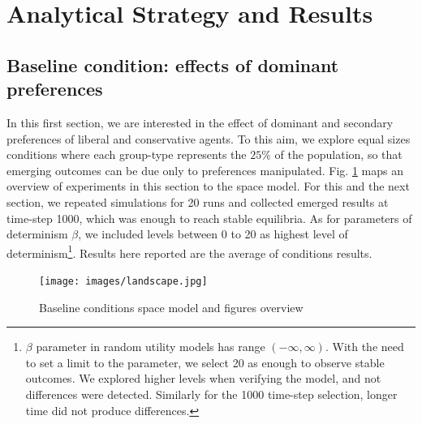 \documentclass[
]{article}
\begin{document}
\hypertarget{Analytical Strategy and Results}{%
\section{Analytical Strategy and Results}\label{results}}


\subsection{Baseline condition: effects of dominant preferences}

In this first section, we are interested in the effect of dominant and secondary preferences of liberal and conservative agents. To this aim, we explore equal sizes conditions where each group-type represents the $25\%$ of the population, so that emerging outcomes can be due only to preferences manipulated. Fig. \ref{fig:landscape} maps an overview of experiments in this section to the space model. For this and the next section, we repeated simulations for 20 runs and collected emerged results at time-step 1000, which was enough to reach stable equilibria. As for parameters of determinism $\beta$, we included levels between 0 to 20 as highest level of determinism\footnote{$\beta$ parameter in random utility models has range $(-\infty,\infty)$. With the need to set a limit to the parameter, we select 20 as enough to observe stable outcomes. We explored higher levels when verifying the model, and not differences were detected. Similarly for the 1000 time-step selection, longer time did not produce differences.}. Results here reported are the average of conditions results.

\begin{figure}
    \centering
    \texttt{[image: images/landscape.jpg]}
    \caption{Baseline conditions space model and figures overview}
    \label{fig:landscape}
\end{figure}
\end{document}
